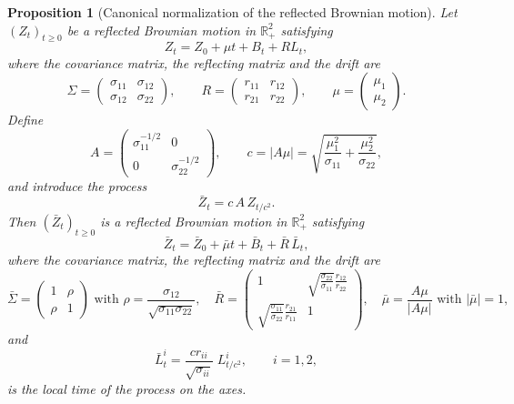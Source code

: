\documentclass[10pt,a4paper]{amsart}
\newtheorem{prop}{Proposition}
\begin{document}
\begin{prop}[Canonical normalization of the reflected Brownian motion]
Let $(Z_t)_{t\ge 0}$ be a reflected Brownian motion in $\mathbb{R}_+^2$ satisfying
\[
Z_t = Z_0 + \mu t + B_t + R L_t,
\]
where the covariance matrix, the reflecting matrix and the drift are
\[
\Sigma =
\begin{pmatrix}
\sigma_{11} & \sigma_{12}\\
\sigma_{12} & \sigma_{22}
\end{pmatrix},
\qquad
R =
\begin{pmatrix}
r_{11} & r_{12}\\
r_{21} & r_{22}
\end{pmatrix},
\qquad
\mu= \begin{pmatrix}
\mu_1 \\
\mu_2 
\end{pmatrix}.
\]
Define
\begin{equation}
A =
\begin{pmatrix}
\sigma_{11}^{-1/2} & 0\\
0 & \sigma_{22}^{-1/2}
\end{pmatrix},
\qquad
c = |A\mu|= \sqrt{
\frac{\mu_1^2}{\sigma_{11}} + \frac{\mu_2^2}{\sigma_{22}}
},
\label{eq:Ac}
\end{equation}
and introduce the process
\[
\bar Z_t = c\, A\, Z_{t/c^2}.
\]
Then $(\bar Z_t)_{t\ge 0}$ is a reflected Brownian motion in $\mathbb{R}_+^2$ satisfying
\[
\bar Z_t = \bar Z_0 + \bar\mu t + \bar B_t + \bar R\, \bar L_t,
\]
where the covariance matrix, the reflecting matrix and the drift are
\[
\bar\Sigma =
\begin{pmatrix}
1 & \rho\\
\rho & 1
\end{pmatrix}
\text{ with }
\rho = \frac{\sigma_{12}}{\sqrt{\sigma_{11}\sigma_{22}}},
\quad
\bar R =
\begin{pmatrix}
1 &
\sqrt{\frac{\sigma_{22}}{\sigma_{11}}} \frac{ r_{12}}{r_{22}}\\[1em]
\sqrt{\frac{\sigma_{11}}{\sigma_{22}}} \frac{ r_{21}}{r_{11}} &
1
\end{pmatrix},
\quad
\bar\mu = \frac{A\mu}{|A\mu|}
\text{ with }
|\bar\mu|=1,
\]
and
\[
\bar L_t^i = \frac{cr_{ii} }{\sqrt{\sigma_{ii}}}\; L_{t/c^2}^i,
\qquad i=1,2,
\]
is the local time of the process on the axes.
\end{prop}
\end{document}
